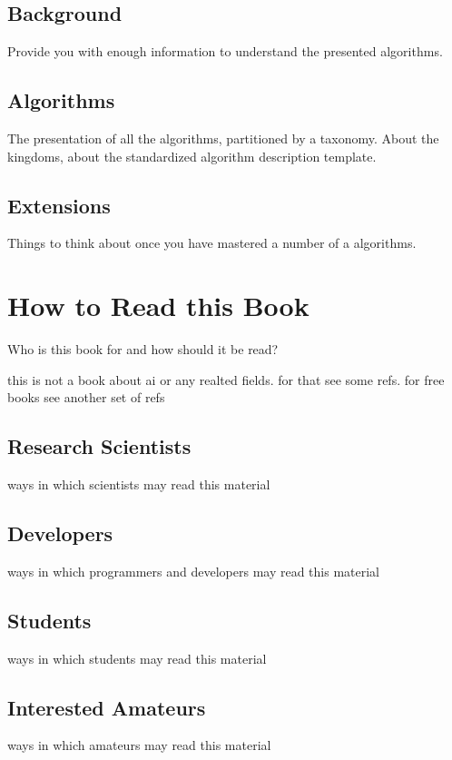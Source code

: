 \subsection{Background}
Provide you with enough information to understand the presented algorithms.

\subsection{Algorithms}
The presentation of all the algorithms, partitioned by a taxonomy. 
About the kingdoms, about the standardized algorithm description template.

\subsection{Extensions}
Things to think about once you have mastered a number of a algorithms.


% 
% 
\section{How to Read this Book}
\label{intro:sec:how_to_read}
Who is this book for and how should it be read?

this is not a book about ai or any realted fields. for that see some refs. 
for free books see another set of refs

\subsection{Research Scientists}
ways in which scientists may read this material

\subsection{Developers}
ways in which programmers and developers may read this material

\subsection{Students}
ways in which students may read this material

\subsection{Interested Amateurs}
ways in which amateurs may read this material

